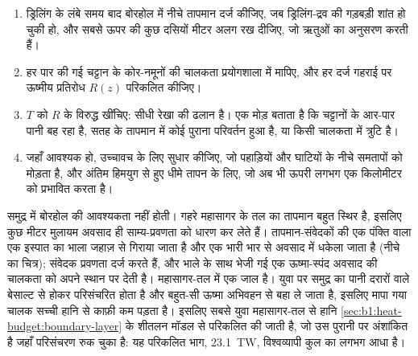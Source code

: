 \begin{method}[बोरहोल से ऊष्मा-प्रवाह]\label{met:b1:heat-budget:borehole}
\begin{enumerate}
  \item ड्रिलिंग के लंबे समय बाद बोरहोल में नीचे तापमान दर्ज कीजिए, जब ड्रिलिंग-द्रव की गड़बड़ी शांत हो चुकी हो, और सबसे ऊपर की कुछ दसियों मीटर अलग रख दीजिए, जो ऋतुओं का अनुसरण करती हैं।
  \item हर पार की गई चट्टान के कोर-नमूनों की चालकता प्रयोगशाला में मापिए, और हर दर्ज गहराई पर ऊष्मीय प्रतिरोध $R(z)$ परिकलित कीजिए।
  \item $T$ को $R$ के विरुद्ध खींचिए: सीधी रेखा की ढलान  है। एक मोड़ बताता है कि चट्टानों के आर-पार पानी बह रहा है, सतह के तापमान में कोई पुराना परिवर्तन हुआ है, या किसी चालकता में त्रुटि है।
  \item जहाँ आवश्यक हो, उच्चावच के लिए सुधार कीजिए, जो पहाड़ियों और घाटियों के नीचे समतापों को मोड़ता है, और अंतिम हिमयुग से हुए धीमे तापन के लिए, जो अब भी ऊपरी लगभग एक किलोमीटर को प्रभावित करता है।
\end{enumerate}
\end{method}

समुद्र में बोरहोल की आवश्यकता नहीं होती। गहरे महासागर के तल का तापमान बहुत स्थिर है, इसलिए कुछ मीटर मुलायम अवसाद ही साम्य-प्रवणता को धारण कर लेते हैं। तापमान-संवेदकों की एक पंक्ति वाला एक इस्पात का भाला जहाज़ से गिराया जाता है और एक भारी भार से अवसाद में धकेला जाता है (नीचे का चित्र); संवेदक प्रवणता दर्ज करते हैं, और भाले के साथ भेजी गई एक ऊष्मा-स्पंद अवसाद की चालकता को अपने स्थान पर देती है। महासागर-तल में एक जाल है। युवा  पर समुद्र का पानी दरारों वाले बेसाल्ट से होकर परिसंचरित होता है और बहुत-सी ऊष्मा अभिवहन से बहा ले जाता है, इसलिए मापा गया चालक  सच्ची हानि से काफ़ी कम पड़ता है। इसलिए सबसे युवा महासागर-तल से हानि \cref{sec:b1:heat-budget:boundary-layer} के शीतलन मॉडल से परिकलित की जाती है, जो उस पुरानी  पर अंशांकित है जहाँ परिसंचरण रुक चुका है: यह परिकलित भाग, \qty{23.1}{TW}, विश्वव्यापी कुल का लगभग आधा है। %

